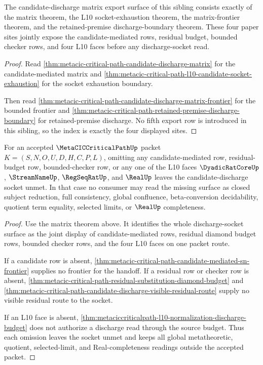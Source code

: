 \begin{theorem}
\label{thm:metacic-critical-path-discharge-matrix-lean-target-index}
The candidate-discharge matrix export surface of this sibling consists exactly of the matrix theorem, the L10 socket-exhaustion theorem, the matrix-frontier theorem, and the retained-premise discharge-boundary theorem. These four paper sites jointly expose the candidate-mediated rows, residual budget, bounded checker rows, and four L10 faces before any discharge-socket read.
\end{theorem}
\begin{proof}
Read \autoref{thm:metacic-critical-path-candidate-discharge-matrix} for the candidate-mediated matrix and \autoref{thm:metacic-critical-path-l10-candidate-socket-exhaustion} for the socket exhaustion boundary.

Then read \autoref{thm:metacic-critical-path-candidate-discharge-matrix-frontier} for the bounded frontier and \autoref{thm:metacic-critical-path-retained-premise-discharge-boundary} for retained-premise discharge. No fifth export row is introduced in this sibling, so the index is exactly the four displayed sites.
\end{proof}

\begin{theorem}
\label{thm:metacic-critical-path-l10-candidate-socket-exhaustion}
For an accepted $\MetaCICCriticalPathUp$ packet $K=(S,N,O,U,D,H,C,P,L)$, omitting any candidate-mediated row, residual-budget row, bounded-checker row, or any one of the L10 faces $\DyadicRatCoreUp$, $\StreamNameUp$, $\RegSeqRatUp$, and $\RealUp$ leaves the candidate-discharge socket unmet. In that case no consumer may read the missing surface as closed subject reduction, full consistency, global confluence, beta-conversion decidability, quotient term equality, selected limits, or $\RealUp$ completeness.
\end{theorem}
\begin{proof}
Use the matrix theorem above. It identifies the whole discharge-socket surface as the joint display of candidate-mediated rows, residual diamond budget rows, bounded checker rows, and the four L10 faces on one packet route.

If a candidate row is absent, \autoref{thm:metacic-critical-path-candidate-mediated-sn-frontier} supplies no frontier for the handoff. If a residual row or checker row is absent, \autoref{thm:metacic-critical-path-residual-substitution-diamond-budget} and \autoref{thm:metacic-critical-path-candidate-discharge-visible-residual-route} supply no visible residual route to the socket.

If an L10 face is absent, \autoref{thm:metaciccriticalpath-l10-normalization-discharge-budget} does not authorize a discharge read through the source budget. Thus each omission leaves the socket unmet and keeps all global metatheoretic, quotient, selected-limit, and Real-completeness readings outside the accepted packet.
\end{proof}

